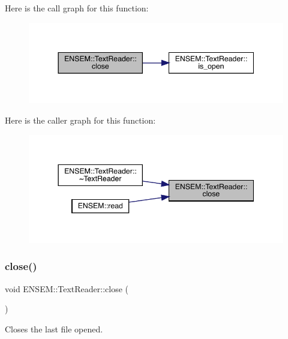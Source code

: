 Here is the call graph for this function\+:\nopagebreak
\begin{figure}[H]
\begin{center}
\leavevmode
\includegraphics[width=344pt]{d4/d23/classENSEM_1_1TextReader_a19f171518a1c7a06739d2d7de016f346_cgraph}
\end{center}
\end{figure}
Here is the caller graph for this function\+:\nopagebreak
\begin{figure}[H]
\begin{center}
\leavevmode
\includegraphics[width=344pt]{d4/d23/classENSEM_1_1TextReader_a19f171518a1c7a06739d2d7de016f346_icgraph}
\end{center}
\end{figure}
\mbox{\label{classENSEM_1_1TextReader_a19f171518a1c7a06739d2d7de016f346}} 
\subsubsection{\texorpdfstring{close()}{close()}\hspace{0.1cm}{\footnotesize\ttfamily [2/2]}}
{\footnotesize\ttfamily void E\+N\+S\+E\+M\+::\+Text\+Reader\+::close (\begin{DoxyParamCaption}{ }\end{DoxyParamCaption})}



Closes the last file opened. 

